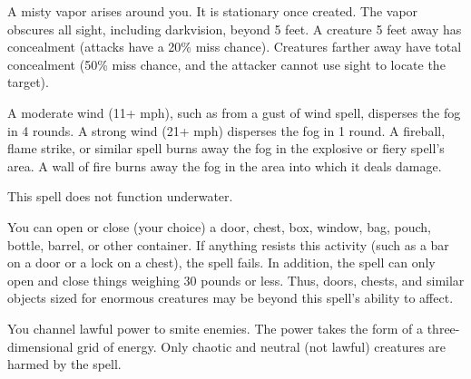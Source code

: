 \begin{multicols}{2}
\begin{small}

\noindent A misty vapor arises around you. It is stationary once created. The vapor obscures all sight, including darkvision, beyond 5 feet. A creature 5 feet away has concealment (attacks have a 20\% miss chance). Creatures farther away have total concealment (50\% miss chance, and the attacker cannot use sight to locate the target).

\smallskip\noindent A moderate wind (11+ mph), such as from a gust of wind spell, disperses the fog in 4 rounds. A strong wind (21+ mph) disperses the fog in 1 round. A fireball, flame strike, or similar spell burns away the fog in the explosive or fiery spell's area. A wall of fire burns away the fog in the area into which it deals damage.

\smallskip\noindent This spell does not function underwater.

\noindent You can open or close (your choice) a door, chest, box, window, bag, pouch, bottle, barrel, or other container. If anything resists this activity (such as a bar on a door or a lock on a chest), the spell fails. In addition, the spell can only open and close things weighing 30 pounds or less. Thus, doors, chests, and similar objects sized for enormous creatures may be beyond this spell's ability to affect.


\noindent You channel lawful power to smite enemies. The power takes the form of a three-dimensional grid of energy. Only chaotic and neutral (not lawful) creatures are harmed by the spell.


\end{small}
\end{multicols}
